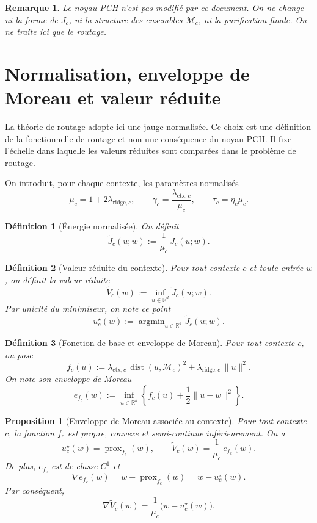\documentclass[11pt,a4paper]{article}
\newtheorem{definition}{Définition}[section]
\newtheorem{proposition}{Proposition}[section]
\newtheorem{remark}{Remarque}[section]
\DeclareMathOperator{\prox}{prox}
\DeclareMathOperator{\argmin}{argmin}
\DeclareMathOperator{\dist}{dist}
\newcommand{\R}{\mathbb R}
\newcommand{\Mcal}{\mathcal M}
\begin{document}
\begin{remark}
Le noyau PCH n'est pas modifié par ce document. On ne change ni la forme de \(J_c\), ni la structure des ensembles \(\Mcal_c\), ni la purification finale. On ne traite ici que le routage.
\end{remark}

\section{Normalisation, enveloppe de Moreau et valeur réduite}

La théorie de routage adopte ici une jauge normalisée. Ce choix est une définition de la fonctionnelle de routage et non une conséquence du noyau PCH. Il fixe l'échelle dans laquelle les valeurs réduites sont comparées dans le problème de routage.

On introduit, pour chaque contexte, les paramètres normalisés
\[
\mu_c = 1 + 2\lambda_{\mathrm{ridge},c},
\qquad
\gamma_c = \frac{\lambda_{\mathrm{ctx},c}}{\mu_c},
\qquad
\tau_c = \eta_c \mu_c.
\]

\begin{definition}[Énergie normalisée]
On définit
\[
\widetilde J_c(u;w) := \frac{1}{\mu_c}\,J_c(u;w).
\]
\end{definition}

\begin{definition}[Valeur réduite du contexte]
Pour tout contexte \(c\) et toute entrée \(w\), on définit la valeur réduite
\[
\widetilde V_c(w)
:=
\inf_{u\in\R^d}\widetilde J_c(u;w).
\]
Par unicité du minimiseur, on note ce point
\[
u_c^\star(w):=\argmin_{u\in\R^d}\widetilde J_c(u;w).
\]
\end{definition}

\begin{definition}[Fonction de base et enveloppe de Moreau]
Pour tout contexte \(c\), on pose
\[
f_c(u):=\lambda_{\mathrm{ctx},c}\,\dist(u,\Mcal_c)^2+\lambda_{\mathrm{ridge},c}\,\|u\|^2.
\]
On note son enveloppe de Moreau
\[
e_{f_c}(w)
:=
\inf_{u\in\R^d}
\left\{
f_c(u)+\frac12\|u-w\|^2
\right\}.
\]
\end{definition}

\begin{proposition}[Enveloppe de Moreau associée au contexte]
Pour tout contexte \(c\), la fonction \(f_c\) est propre, convexe et semi-continue inférieurement. On a
\[
u_c^\star(w)=\prox_{f_c}(w),
\qquad
\widetilde V_c(w)=\frac{1}{\mu_c}\,e_{f_c}(w).
\]
De plus, \(e_{f_c}\) est de classe \(C^1\) et
\[
\nabla e_{f_c}(w)=w-\prox_{f_c}(w)=w-u_c^\star(w).
\]
Par conséquent,
\[
\nabla \widetilde V_c(w)=\frac{1}{\mu_c}\bigl(w-u_c^\star(w)\bigr).
\]
\end{proposition}
\end{document}
